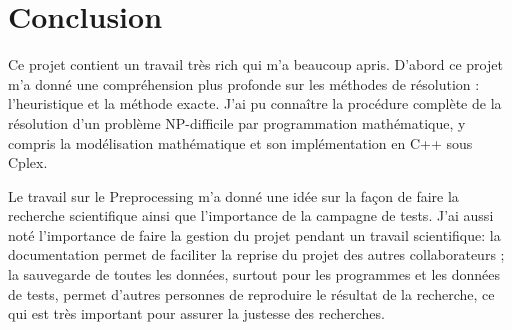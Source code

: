 \chapter{Conclusion}
Ce projet contient un travail très rich qui m'a beaucoup apris. D'abord ce projet m'a donné une compréhension plus profonde sur les méthodes de résolution : l'heuristique et la méthode exacte. J'ai pu connaître la procédure complète de la résolution d'un problème NP-difficile par programmation mathématique, y compris la modélisation mathématique et son implémentation en C++ sous Cplex.

Le travail sur le Preprocessing m'a donné une idée sur la façon de faire la recherche scientifique ainsi que l'importance de la campagne de tests. J'ai aussi noté l'importance de faire la gestion du projet pendant un travail scientifique: la documentation permet de faciliter la reprise du projet des autres collaborateurs ; la sauvegarde de toutes les données, surtout pour les programmes et les données de tests, permet d'autres personnes de reproduire le résultat de la recherche, ce qui est très important pour assurer la justesse des recherches.


